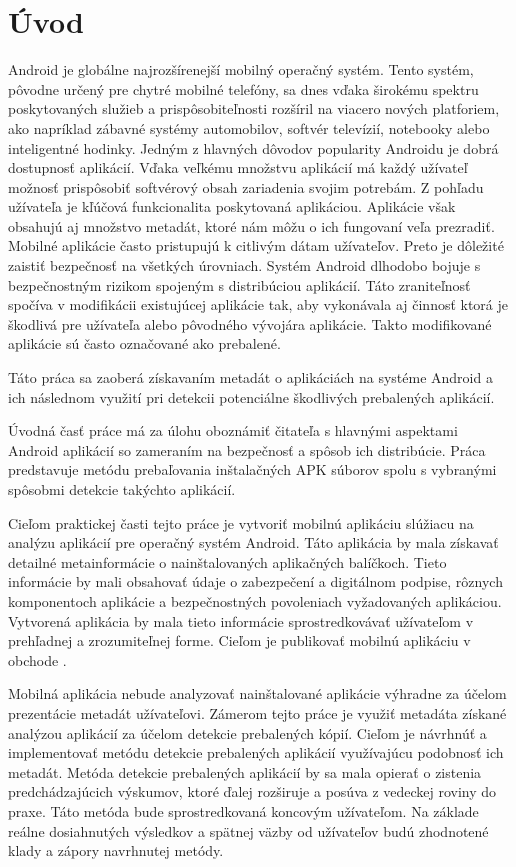 \chapter*{Úvod}
 Android je globálne najrozšírenejší mobilný operačný systém. Tento systém, pôvodne určený pre chytré mobilné telefóny, sa dnes vďaka širokému spektru poskytovaných služieb a prispôsobiteľnosti rozšíril na viacero nových platforiem, ako napríklad zábavné systémy automobilov, softvér televízií, notebooky alebo inteligentné hodinky. Jedným z hlavných dôvodov popularity Androidu je dobrá dostupnosť aplikácií. Vďaka veľkému množstvu aplikácií má každý užívateľ možnosť prispôsobiť softvérový obsah zariadenia svojim potrebám. Z pohľadu užívateľa je kľúčová funkcionalita poskytovaná aplikáciou. Aplikácie však obsahujú aj množstvo metadát, ktoré nám môžu o ich fungovaní veľa prezradiť. Mobilné aplikácie často pristupujú k citlivým dátam užívateľov. Preto je dôležité zaistiť bezpečnosť na všetkých úrovniach. Systém Android dlhodobo bojuje s bezpečnostným rizikom spojeným s distribúciou aplikácií. Táto zraniteľnosť spočíva v modifikácii existujúcej aplikácie tak, aby vykonávala aj činnosť ktorá je škodlivá pre užívateľa alebo pôvodného vývojára aplikácie. Takto modifikované aplikácie sú často označované ako prebalené.

Táto práca sa zaoberá získavaním metadát o aplikáciách na systéme Android a ich následnom využití pri detekcii potenciálne škodlivých prebalených aplikácií.

Úvodná časť práce má za úlohu oboznámiť čitateľa s hlavnými aspektami Android aplikácií so zameraním na bezpečnosť a spôsob ich distribúcie. Práca predstavuje metódu prebaľovania inštalačných APK súborov spolu s vybranými spôsobmi detekcie takýchto aplikácií.

Cieľom praktickej časti tejto práce je vytvoriť mobilnú aplikáciu slúžiacu na analýzu aplikácií pre operačný systém Android. Táto aplikácia by mala získavať detailné metainformácie o nainštalovaných aplikačných balíčkoch. Tieto informácie by mali obsahovať údaje o zabezpečení a digitálnom podpise, rôznych komponentoch aplikácie a bezpečnostných povoleniach vyžadovaných aplikáciou. Vytvorená aplikácia by mala tieto informácie sprostredkovávať užívateľom v prehľadnej a zrozumiteľnej forme. Cieľom je publikovať mobilnú aplikáciu v obchode .

Mobilná aplikácia nebude analyzovať nainštalované aplikácie výhradne za účelom prezentácie metadát užívateľovi. Zámerom tejto práce je využiť metadáta získané analýzou aplikácií za účelom detekcie prebalených kópií. Cieľom je návrhnúť a implementovať metódu detekcie prebalených aplikácií využívajúcu podobnosť ich metadát. Metóda detekcie prebalených aplikácií by sa mala opierať o zistenia predchádzajúcich výskumov, ktoré ďalej rozširuje a posúva z vedeckej roviny do praxe. Táto metóda bude sprostredkovaná koncovým užívateľom. Na základe reálne dosiahnutých výsledkov a spätnej väzby od užívateľov budú zhodnotené klady a zápory navrhnutej metódy.

